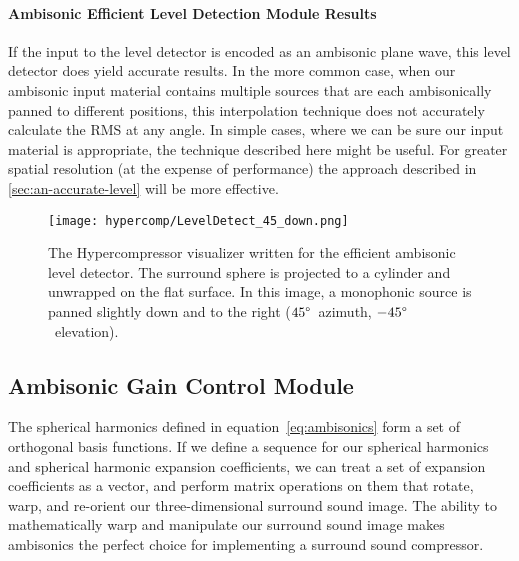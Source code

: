 \paragraph{Ambisonic Efficient Level Detection Module Results}If the
input to the level detector is encoded as an ambisonic plane wave,
this level detector does yield accurate results.  In the more common
case, when our ambisonic input material contains multiple sources that
are each ambisonically panned to different positions, this
interpolation technique does not accurately calculate the RMS at any
angle. In simple cases, where we can be sure our input material is
appropriate, the technique described here might be useful. For greater
spatial resolution (at the expense of performance) the approach
described in \ref{sec:an-accurate-level} will be more effective.

\begin{figure}[h]
  \texttt{[image: hypercomp/LevelDetect\_45\_down.png]}
  \caption{The Hypercompressor visualizer written for the efficient
    ambisonic level detector. The surround sphere is projected to a
    cylinder and unwrapped on the flat surface. In this image, a
    monophonic source is panned slightly down and to the right
    ($45\degree$~azimuth, $-45\degree$~elevation).}
  \label{fig:hypercomp-inf-map-angle}
\end{figure}

\subsection{Ambisonic Gain Control Module}
\label{sec:ambis-gain-contr}
The spherical harmonics defined in equation~\ref{eq:ambisonics} form a
set of orthogonal basis functions. If we define a sequence for our
spherical harmonics and spherical harmonic expansion coefficients, we
can treat a set of expansion coefficients as a vector, and perform
matrix operations on them that rotate, warp, and re-orient our
three-dimensional surround sound image.\cite{Pomberger2011} The
ability to mathematically warp and manipulate our surround sound image
makes ambisonics the perfect choice for implementing a surround sound
compressor.

